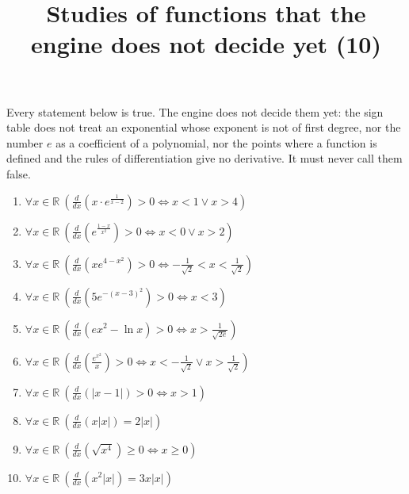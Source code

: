 \documentclass[11pt,a4paper]{article}
\title{Studies of functions that the engine does not decide yet (10)}
\author{}
\date{}
\begin{document}
\maketitle
Every statement below is true. The engine does not decide them yet: the sign table does not treat an exponential whose exponent is not of first degree, nor the number $e$ as a coefficient of a polynomial, nor the points where a function is defined and the rules of differentiation give no derivative. It must never call them false.

\begin{enumerate}
\item $\displaystyle \forall x \in \mathbb{R}\ \left(\frac{d}{dx}\left( x \cdot e^{\frac{1}{x - 2}} \right) > 0 \iff x < 1 \lor x > 4\right)$
\item $\displaystyle \forall x \in \mathbb{R}\ \left(\frac{d}{dx}\left( e^{\frac{1 - x}{x^{2}}} \right) > 0 \iff x < 0 \lor x > 2\right)$
\item $\displaystyle \forall x \in \mathbb{R}\ \left(\frac{d}{dx}\left( xe^{4 - x^{2}} \right) > 0 \iff -\frac{1}{\sqrt{2}} < x < \frac{1}{\sqrt{2}}\right)$
\item $\displaystyle \forall x \in \mathbb{R}\ \left(\frac{d}{dx}\left( 5e^{-(x - 3)^{2}} \right) > 0 \iff x < 3\right)$
\item $\displaystyle \forall x \in \mathbb{R}\ \left(\frac{d}{dx}\left( ex^{2} - \ln x \right) > 0 \iff x > \frac{1}{\sqrt{2e}}\right)$
\item $\displaystyle \forall x \in \mathbb{R}\ \left(\frac{d}{dx}\left( \frac{e^{x^{2}}}{x} \right) > 0 \iff x < -\frac{1}{\sqrt{2}} \lor x > \frac{1}{\sqrt{2}}\right)$
\item $\displaystyle \forall x \in \mathbb{R}\ \left(\frac{d}{dx}\left( |x - 1| \right) > 0 \iff x > 1\right)$
\item $\displaystyle \forall x \in \mathbb{R}\ \left(\frac{d}{dx}\left( x|x| \right) = 2|x|\right)$
\item $\displaystyle \forall x \in \mathbb{R}\ \left(\frac{d}{dx}\left( \sqrt{x^{4}} \right) \ge 0 \iff x \ge 0\right)$
\item $\displaystyle \forall x \in \mathbb{R}\ \left(\frac{d}{dx}\left( x^{2}\left|x\right| \right) = 3x\left|x\right|\right)$
\end{enumerate}
\end{document}
